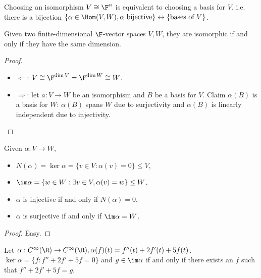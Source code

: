 \documentclass[a4paper]{article}
\theoremstyle{definition}
\begin{document}
\begin{rmk}
  Choosing an isomorphism \(V \cong \F^n\) is equivalent to choosing a basis for \(V\). i.e. there is a bijection \(\{\alpha\in\Hom(V,W), \alpha\text{ bijective}\} \leftrightarrow \{\text{bases of } V\} \).
\end{rmk}

\begin{thm}
  Given two finite-dimensional \(\F\)-vector spaces \(V, W\), they are isomorphic if and only if they have the same dimension.
\end{thm}

\begin{proof}\leavevmode
  \begin{itemize}
  \item \(\Leftarrow\): \(V \cong \F^{\dim V} = \F^{\dim W} \cong W\).
  \item \(\Rightarrow\): let \(a:V\to W\) be an isomorphism and \(B\) be a basis for \(V\). Claim \(\alpha(B)\) is a basis for \(W\): \(\alpha(B)\) spans \(W\) due to surjectivity and \(\alpha(B)\) is linearly independent due to injectivity.
  \end{itemize}
\end{proof}

\begin{defi}
  Given \(\alpha: V\to W\),
  \begin{itemize}
  \item \(N(\alpha) = \ker \alpha = \{v\in V: \alpha(v) = 0\} \leq V\),
  \item \(\im \alpha = \{w\in W: \exists v\in V, \alpha(v) = w \} \leq W\).
  \end{itemize}
\end{defi}

\begin{prop}\leavevmode
  \begin{itemize}
  \item \(\alpha\) is injective if and only if \(N(\alpha) = 0\),
  \item \(\alpha\) is surjective if and only if \(\im \alpha = W\).
  \end{itemize}
\end{prop}

\begin{proof}
  Easy.
\end{proof}

\begin{eg}
  Let \(\alpha: C^\infty(\R) \to C^\infty(\R), \alpha(f)(t) = f''(t)+2f'(t)+5f(t)\). \(\ker \alpha = \{f:f''+2f'+5f=0\}\) and \(g\in \im \alpha\) if and only if there exists an \(f\) such that \(f''+2f'+5f=g\).
\end{eg}
\end{document}
